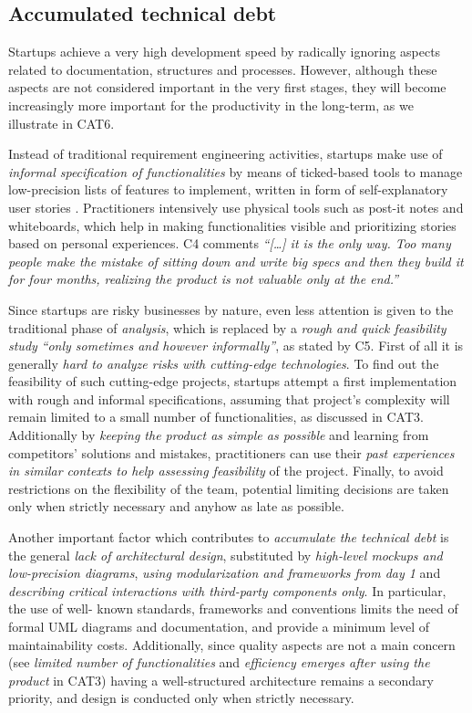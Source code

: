 \documentclass[10pt,journal,letterpaper,compsoc]{IEEEtran}
\begin{document}
\subsection{Accumulated technical debt}\label{res:gsm:cat5} 
Startups achieve a very high development speed by radically ignoring aspects  
related to documentation, structures and processes. However, although these  
aspects are not considered important in the very first stages, they will become
increasingly more important for the productivity in the long-term, as we
illustrate in CAT6.

Instead of traditional requirement engineering activities, startups make use of
\textit{informal specification of functionalities} by means of ticked-based
tools to manage low-precision lists of features to implement, written in form of
self-explanatory user stories \cite{AgilePlan}. Practitioners intensively use
physical tools such as post-it notes and whiteboards, which help in making
functionalities visible and prioritizing stories based on personal experiences.
C4 comments \textit{``[\ldots] it is the only way. Too many people make the
mistake of sitting down and write big specs and then they build it for four
months, realizing the product is not valuable only at the end.''}

Since startups are risky businesses by nature, even less attention is given to
the traditional phase of \textit{analysis}, which is replaced by a \textit{rough
and quick feasibility study}   \textit{``only sometimes and however
informally''}, as stated by C5.  First of all it is generally \textit{hard to
analyze risks with cutting-edge technologies}. To find out the feasibility of
such cutting-edge projects, startups attempt a first implementation with rough
and informal specifications, assuming that project's complexity will remain
limited to a small number of functionalities, as discussed in CAT3. Additionally
by \textit{keeping the product as simple as possible} and learning from
competitors' solutions and mistakes, practitioners can use their \textit{past
experiences in similar contexts to help assessing feasibility} of the project.
Finally, to avoid restrictions on the flexibility of the team, potential
limiting decisions are taken only when strictly necessary and anyhow as late as
possible.

Another important factor which contributes to \textit{accumulate the technical
debt} is the general \textit{lack of architectural design}, substituted by
\textit{high-level mockups and low-precision diagrams}, \textit{using
modularization and frameworks from day 1} and \textit{describing critical
interactions with third-party components only}. In particular, the use of  well-
known standards, frameworks and conventions limits the need of formal UML
\cite{UML} diagrams and documentation, and provide a minimum level of
maintainability costs. Additionally, since quality aspects are not a main
concern (see \textit{limited number of functionalities} and \textit{efficiency
emerges after using the product} in CAT3) having a well-structured architecture
remains a secondary priority, and design is conducted only when strictly
necessary.
\end{document}

